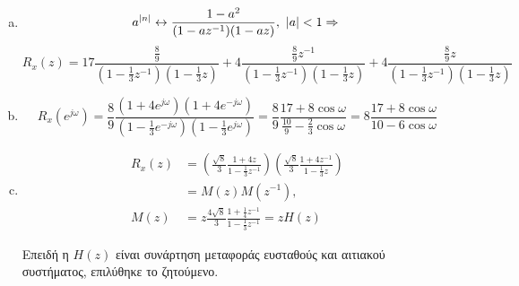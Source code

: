 \begin{enumerate}[(a)]

\item

    \begin{equation*}
    a^{|n|} \leftrightarrow \frac{1-a^2}{(1-az^{-1})(1-az)},\ |a| < 1 \Rightarrow \\
    \end{equation*}
    \begin{equation*}
    R_x(z) = 17 \frac{\frac89}{(1-\frac13z^{-1})(1-\frac13z)} + 4\frac{\frac89z^{-1}}{(1-\frac13z^{-1})(1-\frac13z)} + 4\frac{\frac89z}{(1-\frac13z^{-1})(1-\frac13z)}
    \end{equation*}

\item
    \begin{equation*} R_x(e^{j\omega}) = \frac89 \frac{(1+4e^{j\omega})(1+4e^{-j\omega})}{(1-\frac13e^{-j\omega})(1-\frac13e^{j\omega})} = \frac89\frac{17+8\cos\omega}{\frac{10}9-\frac23\cos\omega}
                                       = 8 \frac{17+8\cos\omega}{10-6\cos\omega} \end{equation*}

\item
    \begin{align*} 
        R_x(z) &= \left( \frac{\sqrt{8}}{3} \frac{1+4z}{1-\frac13z^{-1}}\right) \left( \frac{\sqrt{8}}{3} \frac{1+4z^{-1}}{1-\frac13z}\right) \\
               &= M(z) M(z^{-1}), \\
        M(z) &= z \frac{4\sqrt{8}}{3} \frac{1+\frac14z^{-1}}{1-\frac13z^{-1}} = z H(z)
    \end{align*}

    Επειδή η $H(z)$ είναι συνάρτηση μεταφοράς ευσταθούς και αιτιακού συστήματος, επιλύθηκε το ζητούμενο.
\end{enumerate}
